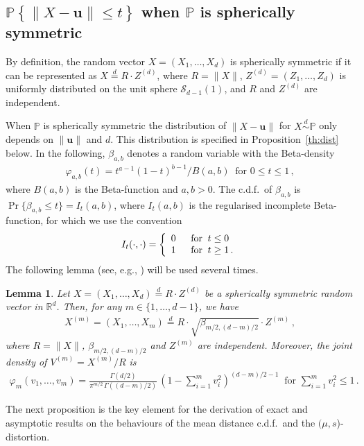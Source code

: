 \documentclass{article}
\def\eqd{\stackrel{{d}}{=}}
\def\RR{\mathds{R}}
\def\simd{\stackrel{d}{\sim}}
\def\PP{\mathbb{P}}
\def\SS{{\mathcal S}}
\newcommand{\bea}{\begin{eqnarray*}}
\newcommand{\eea}{\end{eqnarray*}}
\newcommand{\be}{\begin{eqnarray}}
\newcommand{\ee}{\end{eqnarray}}
\def\ub{\mathbf{u}}
\newtheorem{lemma}{Lemma}[section]
\begin{document}
\subsection{$\PP \left\{ \|X- \ub\| \leq t \right\}$ when $\PP$ is spherically symmetric}\label{S:PP-distribution-d2-Xspherical}

By definition, the random vector $X=(X_1, \ldots,X_d)$ is spherically symmetric if it can be represented as $X \eqd  R \cdot Z^{(d)} $, where $R=\|X\|$, $Z^{(d)}=(Z_1,\ldots,Z_d)$ is uniformly distributed on the unit sphere $\SS_{d-1}(1)$, and $R$ and $Z^{(d)}$ are independent.

When $\PP$ is spherically symmetric the distribution of $\|X  - \ub \|$ for $X\simd \PP$ only depends on $\|\ub\|$ and $d$. This distribution is specified in Proposition~\ref{th:dist} below. In the following, $\beta_{a,b}$ denotes a random variable with the Beta-density
\bea
\varphi_{a,b}(t)=t^{a-1}(1-t)^{b-1}/B(a,b) \ \mbox{ for } 0\leq t \leq 1\,,
\eea
where $B(a,b)$ is the Beta-function and $a,b>0$. The c.d.f.\ of $\beta_{a,b}$ is $\Pr\{\beta_{a,b} \leq t\}=I_t(a,b)$, where $I_t(a,b)$ is the regularised incomplete Beta-function, for which we use the convention
\be\label{convention}
I_t(\cdot,\cdot)=   \left \{\begin{array}{ll}
    0 &\;\;  {\rm for}\;\; t\leq 0 \\
  1 & \;\; {\rm for}\;\; t \geq 1 \, .\\
  \end{array}
\right.
\ee
The following lemma (see, e.g., \cite[Sect.~2.2]{FangKN90}) will be used several times.

\begin{lemma}\label{L:projections-beta}
Let $X=(X_1,\ldots,X_d) \eqd  R \cdot Z^{(d)}$ be a spherically symmetric random vector in $\RR^d$. Then, for any $m\in\{1,\ldots,d-1\}$, we have
\bea
X^{(m)}=(X_1,\ldots,X_m) \eqd  R \cdot \sqrt{\beta_{m/2,(d-m)/2}}\cdot Z^{(m)} \,,
\eea
where $R=\|X\|$, $\beta_{m/2,(d-m)/2}$ and $Z^{(m)}$ are independent.  Moreover, the joint density of $V^{(m)}=X^{(m)}/R$ is
\bea
\varphi_m(v_1,\ldots,v_m)= \frac{\Gamma(d/2)}{\pi^{m/2}\,\Gamma((d-m)/2)} \, \left(1-\sum_{i=1}^m v_i^2 \right)^{(d-m)/2-1} \ \mbox{ for } \sum_{i=1}^m v_i^2\leq 1\,.
\eea
\end{lemma}

The next proposition is the key element for the derivation of exact and asymptotic results on the behaviours of the mean distance c.d.f.\ and the $(\mu,s$)-distortion.
\end{document}
